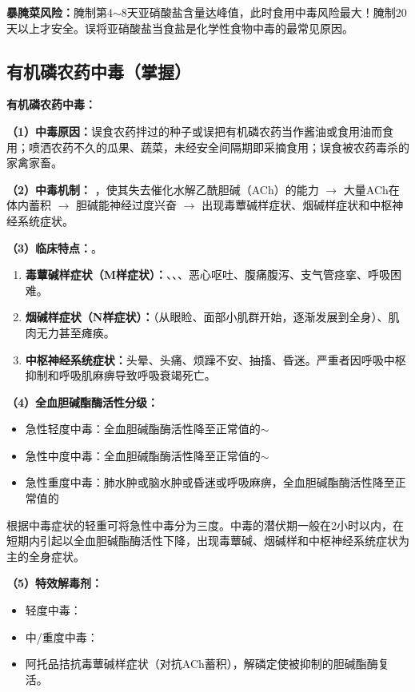 \begin{tipbox}
\textbf{暴腌菜风险：}腌制第4$\sim$8天亚硝酸盐含量达峰值，此时食用中毒风险最大！腌制20天以上才安全。误将亚硝酸盐当食盐是化学性食物中毒的最常见原因。
\end{tipbox}

\subsection{有机磷农药中毒（掌握）}

\begin{keybox}
\textbf{有机磷农药中毒：}

\textbf{（1）中毒原因：}误食农药拌过的种子或误把有机磷农药当作酱油或食用油而食用；喷洒农药不久的瓜果、蔬菜，未经安全间隔期即采摘食用；误食被农药毒杀的家禽家畜。

\textbf{（2）中毒机制：}\difficulty
{}，使其失去催化水解乙酰胆碱（ACh）的能力 $\to$ 大量ACh在体内蓄积 $\to$ 胆碱能神经过度兴奋 $\to$ 出现毒蕈碱样症状、烟碱样症状和中枢神经系统症状。

\textbf{（3）临床特点：}。
\begin{enumerate}[leftmargin=*]
    \item \textbf{毒蕈碱样症状（M样症状）：}、、、恶心呕吐、腹痛腹泻、支气管痉挛、呼吸困难。
    \item \textbf{烟碱样症状（N样症状）：}（从眼睑、面部小肌群开始，逐渐发展到全身）、肌肉无力甚至瘫痪。
    \item \textbf{中枢神经系统症状：}头晕、头痛、烦躁不安、抽搐、昏迷。严重者因呼吸中枢抑制和呼吸肌麻痹导致呼吸衰竭死亡。
\end{enumerate}

\textbf{（4）全血胆碱酯酶活性分级：}
\begin{itemize}[leftmargin=*]
    \item 急性轻度中毒：全血胆碱酯酶活性降至正常值的$\sim$
    \item 急性中度中毒：全血胆碱酯酶活性降至正常值的$\sim$
    \item 急性重度中毒：肺水肿或脑水肿或昏迷或呼吸麻痹，全血胆碱酯酶活性降至正常值的
\end{itemize}
根据中毒症状的轻重可将急性中毒分为三度。中毒的潜伏期一般在2小时以内，在短期内引起以全血胆碱酯酶活性下降，出现毒蕈碱、烟碱样和中枢神经系统症状为主的全身症状。

\textbf{（5）特效解毒剂：}
\begin{itemize}[leftmargin=*]
    \item 轻度中毒：
    \item 中/重度中毒：
    \item 阿托品拮抗毒蕈碱样症状（对抗ACh蓄积），解磷定使被抑制的胆碱酯酶复活。
\end{itemize}


\end{keybox}
